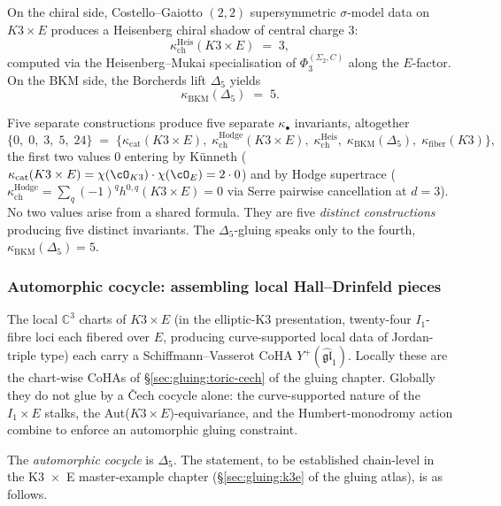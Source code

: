 On the chiral side, Costello--Gaiotto $(2, 2)$ supersymmetric $\sigma$-model data on $K3 \times E$ produces a Heisenberg chiral shadow of central charge $3$:
\[
 \kappa_{\mathrm{ch}}^{\mathrm{Heis}}(K3 \times E) \;=\; 3,
\]
computed via the Heisenberg--Mukai specialisation of $\Phi_3^{(\Sigma_2, C)}$ along the $E$-factor. On the BKM side, the Borcherds lift $\Delta_5$ yields
\[
 \kappa_{\mathrm{BKM}}(\Delta_5) \;=\; 5.
\]

Five separate constructions produce five separate $\kappa_\bullet$ invariants, altogether
\[
 \{0, \; 0, \; 3, \; 5, \; 24\} \;=\; \bigl\{\kappa_{\mathrm{cat}}(K3 \times E), \; \kappa_{\mathrm{ch}}^{\mathrm{Hodge}}(K3 \times E), \; \kappa_{\mathrm{ch}}^{\mathrm{Heis}}, \; \kappa_{\mathrm{BKM}}(\Delta_5), \; \kappa_{\mathrm{fiber}}(K3)\bigr\},
\]
the first two values $0$ entering by Künneth ($\kappa_{\mathrm{cat}}(K3 \times E) = \chi(\cO_{K3}) \cdot \chi(\cO_E) = 2 \cdot 0$) and by Hodge supertrace ($\kappa_{\mathrm{ch}}^{\mathrm{Hodge}} = \sum_q (-1)^q h^{0, q}(K3 \times E) = 0$ via Serre pairwise cancellation at $d = 3$). No two values arise from a shared formula. They are five \emph{distinct constructions} producing five distinct invariants. The $\Delta_5$-gluing speaks only to the fourth, $\kappa_{\mathrm{BKM}}(\Delta_5) = 5$.

\subsubsection{Automorphic cocycle: assembling local Hall--Drinfeld pieces}

The local $\mathbb C^3$ charts of $K3 \times E$ (in the elliptic-K3 presentation, twenty-four $I_1$-fibre loci each fibered over $E$, producing curve-supported local data of Jordan-triple type) each carry a Schiffmann--Vasserot CoHA $Y^+(\widehat{\mathfrak{gl}}_1)$. Locally these are the chart-wise CoHAs of \S\ref{sec:gluing:toric-cech} of the gluing chapter. Globally they do not glue by a Čech cocycle alone: the curve-supported nature of the $I_1 \times E$ stalks, the Aut($K3 \times E$)-equivariance, and the Humbert-monodromy action combine to enforce an automorphic gluing constraint.

The \emph{automorphic cocycle} is $\Delta_5$. The statement, to be established chain-level in the K3~$\times$~E master-example chapter (\S\ref{sec:gluing:k3e} of the gluing atlas), is as follows.

